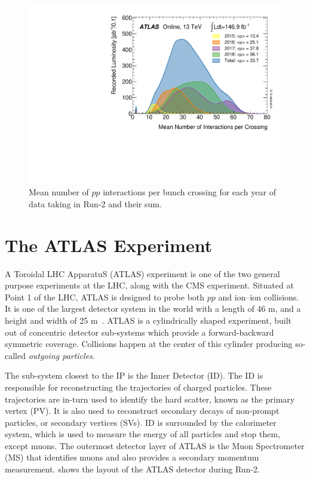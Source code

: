 \begin{figure}[!ht]
    \centering
    \includegraphics[width=0.6\linewidth]{figures/analysis_overview/mu_2015_2018.pdf}
    \caption{Mean number of $pp$ interactions per bunch crossing for each year of data taking in Run-2 and their sum.~\cite{atlas-lumi-pub}}
    \label{fig:pileup}
\end{figure}

\section{The ATLAS Experiment} \label{sec:atlas}

A Toroidal LHC ApparatuS (ATLAS) experiment is one of the two general purpose experiments at the LHC, along with the CMS experiment. Situated at Point 1 of the LHC, ATLAS is designed to probe both $pp$ and ion--ion collisions. It is one of the largest detector system in the world with a length of 46 m, and a height and width of 25 m~\cite{ATLAS}. ATLAS is a cylindrically shaped experiment, built out of concentric detector sub-systems which provide a forward-backward symmetric coverage. Collisions happen at the center of this cylinder producing so-called \textit{outgoing particles}.

The sub-system closest to the IP is the Inner Detector (ID). The ID is responsible for reconstructing the trajectories of charged particles. These trajectories are in-turn used to identify the hard scatter, known as the primary vertex (PV). It is also used to reconstruct secondary decays of non-prompt particles, or secondary vertices (SVs). ID is surrounded by the calorimeter system, which is used to measure the energy of all particles and stop them, except muons. The outermost detector layer of ATLAS is the Muon Spectrometer (MS) that identifies muons and also provides a secondary momentum measurement.  shows the layout of the ATLAS detector during Run-2.


